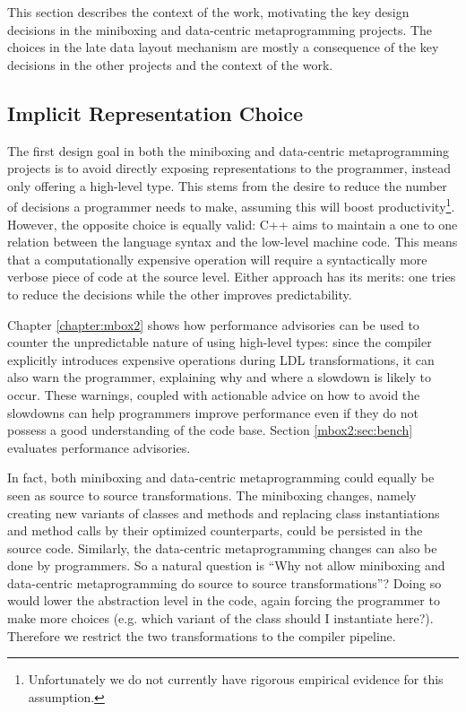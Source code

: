 This section describes the context of the work, motivating the key design decisions in the miniboxing and data-centric metaprogramming projects. The choices in the late data layout mechanism are mostly a consequence of the key decisions in the other projects and the context of the work.

\subsection{Implicit Representation Choice}

The first design goal in both the miniboxing and data-centric metaprogramming projects is to avoid directly exposing representations to the programmer, instead only offering a high-level type. This stems from the desire to reduce the number of decisions a programmer needs to make, assuming this will boost productivity\footnote{Unfortunately we do not currently have rigorous empirical evidence for this assumption.}. However, the opposite choice is equally valid: C++ aims to maintain a one to one relation between the language syntax and the low-level machine code. This means that a computationally expensive operation will require a syntactically more verbose piece of code at the source level. Either approach has its merits: one tries to reduce the decisions while the other improves predictability.

Chapter \ref{chapter:mbox2} shows how performance advisories can be used to counter the unpredictable nature of using high-level types: since the compiler explicitly introduces expensive operations during LDL transformations, it can also warn the programmer, explaining why and where a slowdown is likely to occur. These warnings, coupled with actionable advice on how to avoid the slowdowns can help programmers improve performance even if they do not possess a good understanding of the code base. Section \ref{mbox2:sec:bench} evaluates performance advisories.

In fact, both miniboxing and data-centric metaprogramming could equally be seen as source to source transformations. The miniboxing changes, namely creating new variants of classes and methods and replacing class instantiations and method calls by their optimized counterparts, could be persisted in the source code. Similarly, the data-centric metaprogramming changes can also be done by programmers. So a natural question is ``Why not allow miniboxing and data-centric metaprogramming do source to source transformations''? Doing so would lower the abstraction level in the code, again forcing the programmer to make more choices (e.g. which variant of the class should I instantiate here?). Therefore we restrict the two transformations to the compiler pipeline.

